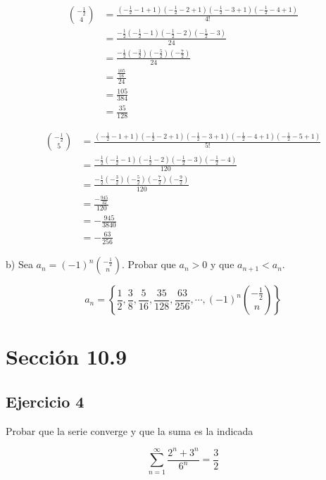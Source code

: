 \documentclass{article}
\begin{document}
    \begin{align*}
    \binom{-\frac{1}{2}}{4} & =\frac{\left(-\frac{1}{2}-1+1\right)\left(-\frac{1}{2}-2+1\right)\left(-\frac{1}{2}-3+1\right)\left(-\frac{1}{2}-4+1\right)}{4!} \\
    & =\frac{-\frac{1}{2}\left(-\frac{1}{2}-1\right)\left(-\frac{1}{2}-2\right)\left(-\frac{1}{2}-3\right)}{24} \\
    & =\frac{-\frac{1}{2}\left(-\frac{3}{2}\right)\left(-\frac{5}{2}\right)\left(-\frac{7}{2}\right)}{24} \\
    & =\frac{\frac{105}{16}}{24} \\
    & =\frac{105}{384} \\
    & =\frac{35}{128}
    \end{align*}

    \begin{align*}
    \binom{-\frac{1}{2}}{5} & =\frac{\left(-\frac{1}{2}-1+1\right)\left(-\frac{1}{2}-2+1\right)\left(-\frac{1}{2}-3+1\right)\left(-\frac{1}{2}-4+1\right)\left(-\frac{1}{2}-5+1\right)}{5!} \\
    & =\frac{-\frac{1}{2}\left(-\frac{1}{2}-1\right)\left(-\frac{1}{2}-2\right)\left(-\frac{1}{2}-3\right)\left(-\frac{1}{2}-4\right)}{120} \\
    & =\frac{-\frac{1}{2}\left(-\frac{3}{2}\right)\left(-\frac{5}{2}\right)\left(-\frac{7}{2}\right)\left(-\frac{9}{2}\right)}{120} \\
    & =\frac{-\frac{945}{32}}{120} \\
    & =-\frac{945}{3840} \\
    & =-\frac{63}{256}
    \end{align*}

    b) Sea $a_{n}=(-1)^{n}\binom{-\frac{1}{2}}{n}$. Probar que $a_{n}>0$ y que $a_{n+1}<a_{n}$.

    $$
    a_{n}=\left\{\frac{1}{2}, \frac{3}{8}, \frac{5}{16}, \frac{35}{128}, \frac{63}{256}, \cdots,(-1)^{n}\binom{-\frac{1}{2}}{n}\right\}
    $$

    \section*{Sección 10.9}
    \subsection*{Ejercicio 4}

    Probar que la serie converge y que la suma es la indicada

    $$
    \sum_{n=1}^{\infty} \frac{2^{n}+3^{n}}{6^{n}}=\frac{3}{2}
    $$
\end{document}
